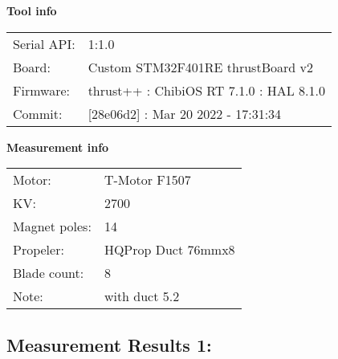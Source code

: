 \documentclass[10pt]{article}
\begin{document}
\noindent
{\large \bf Tool info}
\vspace{3mm}

\noindent
\begin{tabular}{ll}
Serial API:  & 1:1.0\\ 
Board:       & Custom STM32F401RE thrustBoard v2\\ 
Firmware:    & thrust++ : ChibiOS RT 7.1.0 : HAL 8.1.0\\ 
Commit:      & [28e06d2] : Mar 20 2022 - 17:31:34
\end{tabular}
\vspace{3mm}

\noindent
{\large \bf Measurement info}
\vspace{3mm}

\noindent
\begin{tabular}{ll}
Motor:        & T-Motor F1507\\ 
KV:           & 2700\\ 
Magnet poles: & 14\\ 
Propeler:     & HQProp Duct 76mmx8\\ 
Blade count:  & 8\\ 
Note:         & with duct 5.2
\end{tabular}

\vspace{3mm}


\subsection*{\large \bf Measurement Results 1:}
\end{document}

